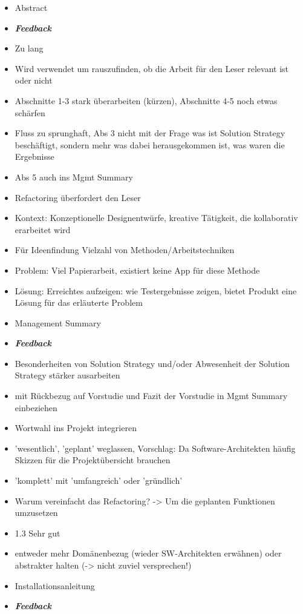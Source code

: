 \begin{itemize}
\item Abstract 
\item \emph{\textbf{Feedback}}
\item Zu lang
\item Wird verwendet um rauszufinden, ob die Arbeit für den Leser relevant ist oder nicht
\item Abschnitte 1-3 stark überarbeiten (kürzen), Abschnitte 4-5 noch etwas schärfen
\item Fluss zu sprunghaft, Abs 3 nicht mit der Frage was ist Solution Strategy beschäftigt, sondern mehr was dabei herausgekommen ist, was waren die Ergebnisse
\item Abs 5 auch ins Mgmt Summary
\item Refactoring überfordert den Leser
\item Kontext: Konzeptionelle Designentwürfe, kreative Tätigkeit, die kollaborativ erarbeitet wird
\item Für Ideenfindung Vielzahl von Methoden/Arbeitstechniken
\item Problem: Viel Papierarbeit, existiert keine App für diese Methode
\item Lösung: Erreichtes aufzeigen: wie Testergebnisse zeigen, bietet Produkt eine Lösung für das erläuterte Problem
\item Management Summary 
\item \emph{\textbf{Feedback}}
\item Besonderheiten von Solution Strategy und/oder Abwesenheit der Solution Strategy stärker ausarbeiten
\item mit Rückbezug auf Vorstudie und Fazit der Vorstudie in Mgmt Summary einbeziehen
\item Wortwahl ins Projekt integrieren
\item 'wesentlich', 'geplant' weglassen, Vorschlag: Da Software-Architekten häufig Skizzen für die Projektübersicht brauchen
\item 'komplett' mit 'umfangreich' oder 'gründlich'
\item Warum vereinfacht das Refactoring? -\textgreater{} Um die geplanten Funktionen umzusetzen
\item 1.3 Sehr gut
\item entweder mehr Domänenbezug (wieder SW-Architekten erwähnen) oder abstrakter halten (-\textgreater{} nicht zuviel versprechen!)
\item Installationsanleitung 
\item \emph{\textbf{Feedback}}

\end{itemize}
